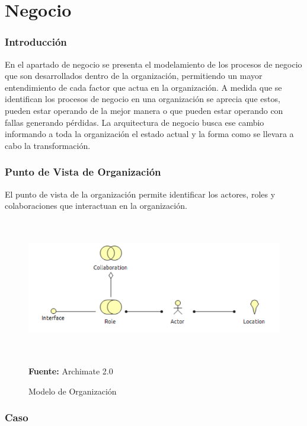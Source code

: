 \section{Negocio}
\subsubsection{Introducción}

En el apartado de negocio se presenta el modelamiento de los procesos de negocio que son desarrollados dentro de la organización, permitiendo un mayor entendimiento de cada factor que actua en la organización. A medida que se identifican los procesos de negocio en una organización se aprecia que estos, pueden estar operando de la mejor manera o que pueden estar operando con fallas generando pérdidas. La arquitectura de negocio busca ese cambio informando a toda la organización el estado actual y la forma como se llevara a cabo la transformación.


\newpage

\subsubsection{Punto de Vista de Organización}

El punto de vista de la organización permite identificar los actores, roles y colaboraciones que interactuan en la organización.


\begin{figure}[th!]
	\centering
	\includegraphics[width=13cm,height=6cm]{arquitectura/negocio/imgs/m_organizacion}
	\caption{Modelo de Organización}{\scriptsize \textbf{Fuente:} Archimate 2.0 \cite{WEB7}}
\end{figure}


\subsubsection{Caso}

